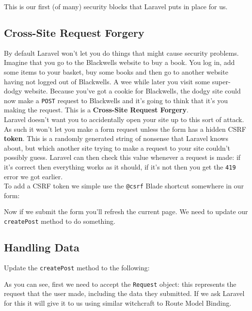 This is our first (of many) security blocks that Laravel puts in place for us.

\subsection{Cross-Site Request Forgery}

By default Laravel won't let you do things that might cause security problems.
\\

Imagine that you go to the Blackwells website to buy a book. You log in, add some items to your basket, buy some books and then go to another website having not logged out of Blackwells. A wee while later you visit some super-dodgy website. Because you've got a cookie for Blackwells, the dodgy site could now make a \texttt{POST} request to Blackwells and it's going to think that it's you making the request. This is a \textbf{Cross-Site Request Forgery}.
\\

Laravel doesn't want you to accidentally open your site up to this sort of attack. As such it won't let you make a form request unless the form has a hidden CSRF \textbf{token}. This is a randomly generated string of nonsense that Laravel knows about, but which another site trying to make a request to your site couldn't possibly guess. Laravel can then check this value whenever a request is made: if it's correct then everything works as it should, if it's not then you get the \texttt{419} error we got earlier.
\\

To add a CSRF token we simple use the \texttt{@csrf} Blade shortcut somewhere in our form:


Now if we submit the form you'll refresh the current page. We need to update our \texttt{createPost} method to do something.


\subsection{Handling Data}

Update the \texttt{createPost} method to the following:



As you can see, first we need to accept the \texttt{Request} object: this represents the request that the user made, including the data they submitted. If we ask Laravel for this it will give it to us using similar witchcraft to Route Model Binding.
\\

